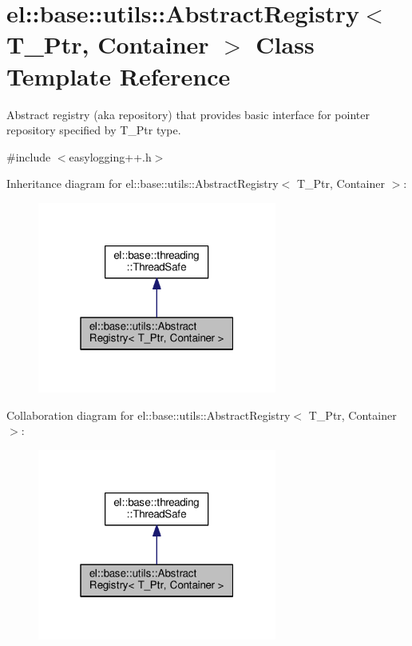 \hypertarget{classel_1_1base_1_1utils_1_1_abstract_registry}{}\section{el\+:\+:base\+:\+:utils\+:\+:Abstract\+Registry$<$ T\+\_\+\+Ptr, Container $>$ Class Template Reference}
\label{classel_1_1base_1_1utils_1_1_abstract_registry}


Abstract registry (aka repository) that provides basic interface for pointer repository specified by T\+\_\+\+Ptr type.  




{\ttfamily \#include $<$easylogging++.\+h$>$}



Inheritance diagram for el\+:\+:base\+:\+:utils\+:\+:Abstract\+Registry$<$ T\+\_\+\+Ptr, Container $>$\+:
\nopagebreak
\begin{figure}[H]
\begin{center}
\leavevmode
\includegraphics[width=223pt]{classel_1_1base_1_1utils_1_1_abstract_registry__inherit__graph}
\end{center}
\end{figure}


Collaboration diagram for el\+:\+:base\+:\+:utils\+:\+:Abstract\+Registry$<$ T\+\_\+\+Ptr, Container $>$\+:
\nopagebreak
\begin{figure}[H]
\begin{center}
\leavevmode
\includegraphics[width=223pt]{classel_1_1base_1_1utils_1_1_abstract_registry__coll__graph}
\end{center}
\end{figure}
